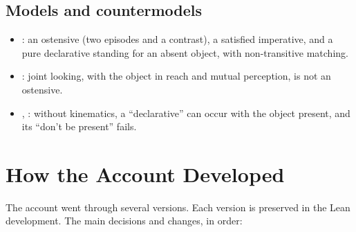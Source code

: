 \documentclass[11pt]{article}
\begin{document}
\subsection{Models and countermodels}
\begin{itemize}
  \item {}: an ostensive (two episodes and a contrast), a satisfied
    imperative, and a pure declarative standing for an absent object, with non-transitive
    matching.
  \item {}: joint looking, with the object in reach and mutual
    perception, is not an ostensive.
  \item {}, : without kinematics, a
    ``declarative'' can occur with the object present, and its ``don't be present'' fails.
\end{itemize}

\section{How the Account Developed}

The account went through several versions. Each version is preserved in the Lean
development. The main decisions and changes, in order:
\end{document}

